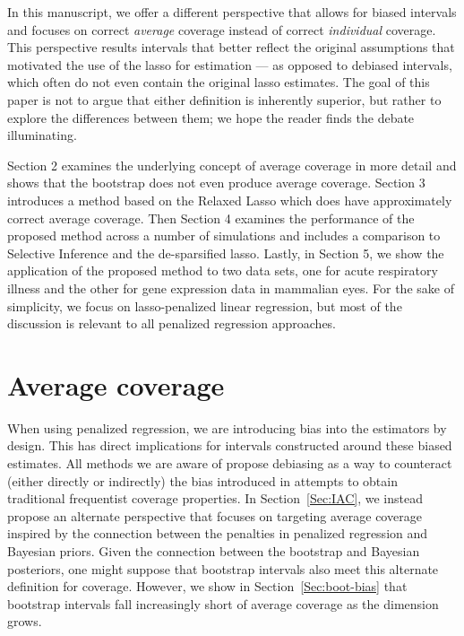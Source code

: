 In this manuscript, we offer a different perspective that allows for biased intervals and focuses on correct \emph{average} coverage instead of correct \emph{individual} coverage. This perspective results intervals that better reflect the original assumptions that motivated the use of the lasso for estimation --- as opposed to debiased intervals, which often do not even contain the original lasso estimates. The goal of this paper is not to argue that either definition is inherently superior, but rather to explore the differences between them; we hope the reader finds the debate illuminating.

Section 2 examines the underlying concept of average coverage in more detail and shows that the bootstrap does not even produce average coverage. Section 3 introduces a method based on the Relaxed Lasso which does have approximately correct average coverage. Then Section 4 examines the performance of the proposed method across a number of simulations and includes a comparison to Selective Inference and the de-sparsified lasso. Lastly, in Section 5, we show the application of the proposed method to two data sets, one for acute respiratory illness and the other for gene expression data in mammalian eyes. For the sake of simplicity, we focus on lasso-penalized linear regression, but most of the discussion is relevant to all penalized regression approaches.

\section{Average coverage}
\label{Sec:difficulties}

When using penalized regression, we are introducing bias into the estimators by design. This has direct implications for intervals constructed around these biased estimates. All methods we are aware of propose debiasing as a way to counteract (either directly or indirectly) the bias introduced in attempts to obtain traditional frequentist coverage properties. In Section~\ref{Sec:IAC}, we instead propose an alternate perspective that focuses on targeting average coverage inspired by the connection between the penalties in penalized regression and Bayesian priors. Given the connection between the bootstrap and Bayesian posteriors, one might suppose that bootstrap intervals also meet this alternate definition for coverage. However, we show in Section~\ref{Sec:boot-bias} that bootstrap intervals fall increasingly short of average coverage as the dimension grows.

